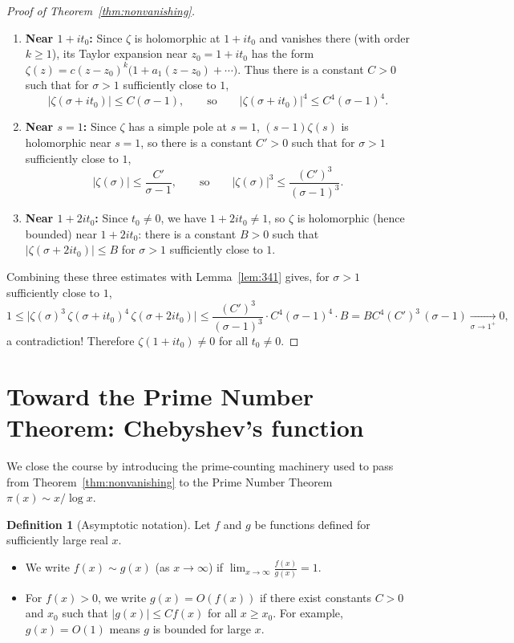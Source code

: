 \documentclass[11pt]{article}
\theoremstyle{plain}
\theoremstyle{definition}
\newtheorem{definition}[theorem]{Definition}
\theoremstyle{boldremark}
\theoremstyle{remark}
\numberwithin{equation}{section}
\begin{document}
\begin{proof}[Proof of Theorem~\ref{thm:nonvanishing}]
\begin{enumerate}[label=\textup{(\arabic*)}]
 \item \textbf{Near $1+it_0$:} Since $\zeta$ is holomorphic at $1+it_0$ and
       vanishes there (with order $k\geq 1$), its Taylor expansion near
       $z_0=1+it_0$ has the form
       $\zeta(z)=c(z-z_0)^k\bigl(1+a_1(z-z_0)+\cdots\bigr)$. Thus there is
       a constant $C>0$ such that for $\sigma>1$ sufficiently close to $1$,
       \[
        |\zeta(\sigma+it_0)| \leq C(\sigma-1),
        \qquad\text{so}\qquad
        |\zeta(\sigma+it_0)|^4 \leq C^4(\sigma-1)^4.
       \]
 \item \textbf{Near $s=1$:} Since $\zeta$ has a simple pole at $s=1$,
       $(s-1)\zeta(s)$ is holomorphic near $s=1$, so there is a constant
       $C'>0$ such that for $\sigma>1$ sufficiently close to $1$,
       \[
        |\zeta(\sigma)| \leq \frac{C'}{\sigma-1},
        \qquad\text{so}\qquad
        |\zeta(\sigma)|^3 \leq \frac{(C')^3}{(\sigma-1)^3}.
       \]
 \item \textbf{Near $1+2it_0$:} Since $t_0\neq 0$, we have $1+2it_0\neq 1$,
       so $\zeta$ is holomorphic (hence bounded) near $1+2it_0$: there is
       a constant $B>0$ such that $|\zeta(\sigma+2it_0)|\leq B$ for
       $\sigma>1$ sufficiently close to $1$.
\end{enumerate}

Combining these three estimates with Lemma~\ref{lem:341} gives, for
$\sigma>1$ sufficiently close to $1$,
\[
 1 \leq \bigl|\zeta(\sigma)^3\,\zeta(\sigma+it_0)^4\,\zeta(\sigma+2it_0)\bigr|
   \leq \frac{(C')^3}{(\sigma-1)^3}\cdot C^4(\sigma-1)^4\cdot B
   = B C^4 (C')^3\,(\sigma-1) \xrightarrow[\sigma\to 1^+]{} 0,
\]
a contradiction! Therefore $\zeta(1+it_0)\neq 0$ for all $t_0\neq 0$.
\end{proof}


\section{Toward the Prime Number Theorem: Chebyshev's function}

We close the course by introducing the prime-counting machinery used to
pass from Theorem~\ref{thm:nonvanishing} to the Prime Number Theorem
$\pi(x)\sim x/\log x$.

\begin{definition}[Asymptotic notation]
Let $f$ and $g$ be functions defined for sufficiently large real $x$.
\begin{itemize}
 \item We write $f(x)\sim g(x)$ (as $x\to\infty$) if
       $\displaystyle\lim_{x\to\infty}\frac{f(x)}{g(x)}=1$.
 \item For $f(x)>0$, we write $g(x)=O(f(x))$ if there exist constants
       $C>0$ and $x_0$ such that $|g(x)|\leq C f(x)$ for all $x\geq x_0$.
       For example, $g(x)=O(1)$ means $g$ is bounded for large $x$.
\end{itemize}
\end{definition}
\end{document}
